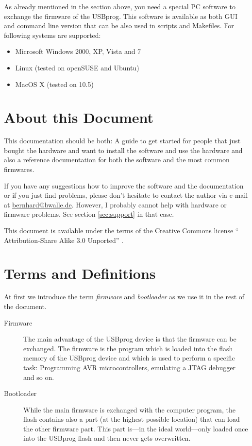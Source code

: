 \documentclass[bibtotoc,UKenglish,halfparskip,oneside,DIV12]{scrreprt}
\begin{document}
As already mentioned in the section above, you need a special PC software to exchange the firmware
of the USBprog. This software is available as both GUI and command line version that can be also
used in scripts and Makefiles. For following systems are supported:

\begin{itemize}
  \item Microsoft Windows 2000, XP, Vista and 7
  \item Linux (tested on openSUSE and Ubuntu)
  \item MacOS X (tested on 10.5)
\end{itemize}

\section{About this Document}

This documentation should be both: A guide to get started for people that just bought the hardware
and want to install the software and use the hardware and also a reference documentation for both
the software and the most common firmwares.

If you have any suggestions how to improve the software and the documentation or if you just find
problems, please don't hesitate to contact the author via e-mail at \url{bernhard@bwalle.de}.
However, I probably cannot help with hardware or firmware problems. See section \vref{sec:support}
in that case.

This document is available under the terms of the Creative Commons license ``
Attribution-Share Alike 3.0 Unported'' \cite{LicenseCC}.

\section{Terms and Definitions}
\label{sec:definitions}

At first we introduce the term \emph{firmware} and \emph{bootloader} as we use it in the rest of the
document.

\begin{description}
  \item[Firmware] The main advantage of the USBprog device is that the firmware can be exchanged.
    The firmware is the program which is loaded into the flash memory of the USBprog device and
    which is used to perform a specific task: Programming AVR microcontrollers, emulating a JTAG
    debugger and so on.

  \item[Bootloader] While the main firmware is exchanged with the computer program, the flash
    contains also a part (at the highest possible location) that can load the other firmware part.
    This part is---in the ideal world---only loaded once into the USBprog flash and then never gets
    overwritten.
\end{description}
\end{document}
